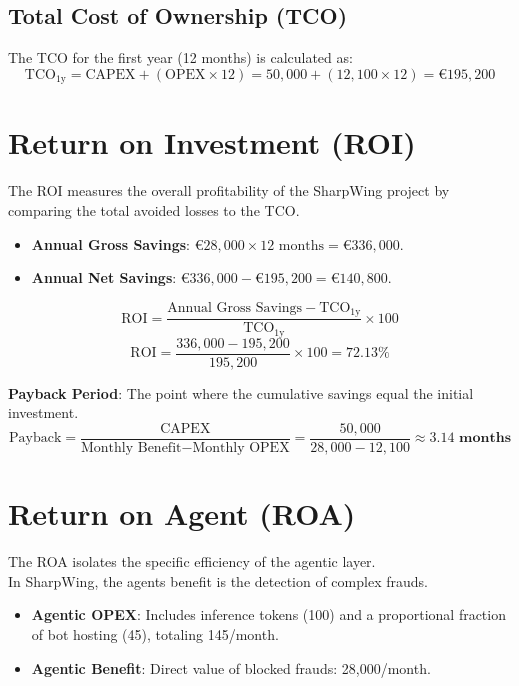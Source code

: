 \documentclass[12pt]{report}
\begin{document}
\subsection{Total Cost of Ownership (TCO)}
The TCO for the first year (12 months) is calculated as:
$$
\text{TCO}_{1\text{y}} = \text{CAPEX} + (\text{OPEX} \times 12) = 50,000 + (12,100 \times 12) = \text{€}195,200
$$

\section{Return on Investment (ROI)}
The ROI measures the overall profitability of the SharpWing project by comparing the total avoided losses to the TCO.

\begin{itemize}
    \item \textbf{Annual Gross Savings}: $\text{€}28,000 \times 12 \text{ months} = \text{€}336,000$.
    \item \textbf{Annual Net Savings}: $\text{€}336,000 - \text{€}195,200 = \text{€}140,800$.
\end{itemize}

$$
\text{ROI} = \frac{\text{Annual Gross Savings} - \text{TCO}_{1\text{y}}}{\text{TCO}_{1\text{y}}} \times 100
$$
$$
\text{ROI} = \frac{336,000 - 195,200}{195,200} \times 100 = \mathbf{72.13\%}
$$

\textbf{Payback Period}: The point where the cumulative savings equal the initial investment.
$$
\text{Payback} = \frac{\text{CAPEX}}{\text{Monthly Benefit} - \text{Monthly OPEX}} = \frac{50,000}{28,000 - 12,100} \approx \mathbf{3.14 \text{ months}}
$$

\section{Return on Agent (ROA)}
The ROA isolates the specific efficiency of the agentic layer. 
\\
In SharpWing, the agents benefit is the detection of complex frauds.

\begin{itemize}
    \item \textbf{Agentic OPEX}: Includes inference tokens (100) and a proportional fraction of bot hosting (45), totaling 145/month.
    \item \textbf{Agentic Benefit}: Direct value of blocked frauds: 28,000/month.
\end{itemize}
\end{document}
